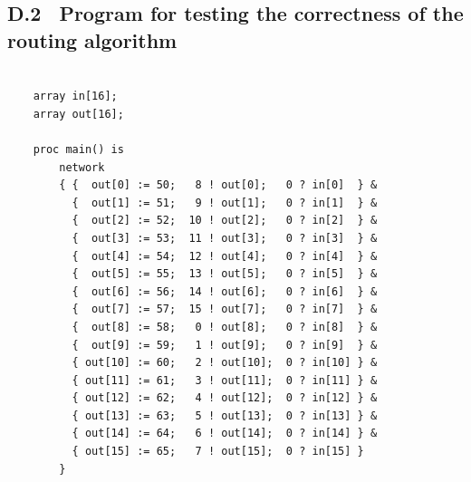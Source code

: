 \documentclass[a4paper, 12pt]{article}
\begin{document}
\subsection*{D.2 \ Program for testing the correctness of the routing algorithm}

\begin{lstlisting}

    array in[16];
    array out[16];

    proc main() is
        network
        { {  out[0] := 50;   8 ! out[0];   0 ? in[0]  } &
          {  out[1] := 51;   9 ! out[1];   0 ? in[1]  } &
          {  out[2] := 52;  10 ! out[2];   0 ? in[2]  } &
          {  out[3] := 53;  11 ! out[3];   0 ? in[3]  } &
          {  out[4] := 54;  12 ! out[4];   0 ? in[4]  } &
          {  out[5] := 55;  13 ! out[5];   0 ? in[5]  } &
          {  out[6] := 56;  14 ! out[6];   0 ? in[6]  } &
          {  out[7] := 57;  15 ! out[7];   0 ? in[7]  } &
          {  out[8] := 58;   0 ! out[8];   0 ? in[8]  } &
          {  out[9] := 59;   1 ! out[9];   0 ? in[9]  } &
          { out[10] := 60;   2 ! out[10];  0 ? in[10] } &
          { out[11] := 61;   3 ! out[11];  0 ? in[11] } &
          { out[12] := 62;   4 ! out[12];  0 ? in[12] } &
          { out[13] := 63;   5 ! out[13];  0 ? in[13] } &
          { out[14] := 64;   6 ! out[14];  0 ? in[14] } &
          { out[15] := 65;   7 ! out[15];  0 ? in[15] } 
        }

\end{lstlisting}

\newpage
\end{document}
